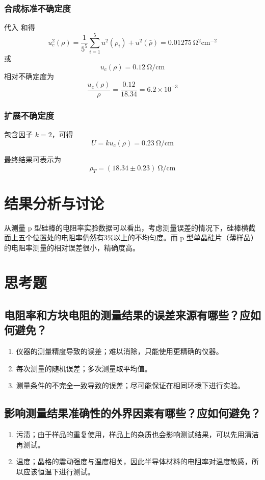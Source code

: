 \documentclass[a4paper,utf8]{article}
\begin{document}
        \subsubsection{合成标准不确定度}
        代入 和得
        \begin{equation}
            u_c^2(\rho)=\frac{1}{5^5} \sum_{i=1}^{5}u^2(\rho_i) + u^2(\bar{\rho})= 0.01275~\unit{\ohm^2\cm^{-2}}
        \end{equation}
        或
        \begin{equation}
            u_c(\rho)=0.12~\unit{\ohm\per\cm}
        \end{equation}
        相对不确定度为
        \begin{equation}
            \frac{u_c(\rho)}{\rho}=\frac{0.12}{18.34} = 6.2 \times 10^{-3}
        \end{equation}
        \subsubsection{扩展不确定度}
        包含因子 $k = 2$，可得
        \begin{equation}
            U=k u_c(\rho)=0.23~\unit{\ohm\per\cm}
        \end{equation}\par
        最终结果可表示为
        \begin{equation}
            \rho_T = (18.34 \pm 0.23)~\unit{\ohm\per\cm}
        \end{equation}
\section{结果分析与讨论}
    从测量 p 型硅棒的电阻率实验数据可以看出，考虑测量误差的情况下，硅棒横截面上五个位置处的电阻率仍然有3\%以上的不均匀度。而 p 型单晶硅片（薄样品）的电阻率测量的相对误差很小，精确度高。
\section{思考题} 
    \subsection{电阻率和方块电阻的测量结果的误差来源有哪些？应如何避免？}
        \begin{enumerate}
            \item 仪器的测量精度导致的误差；难以消除，只能使用更精确的仪器。
            \item 每次测量的随机误差；多次测量取平均值。
            \item 测量条件的不完全一致导致的误差；尽可能保证在相同环境下进行实验。
        \end{enumerate}
    \subsection{影响测量结果准确性的外界因素有哪些？应如何避免？}
        \begin{enumerate}
            \item 污渍；由于样品的重复使用，样品上的杂质也会影响测试结果，可以先用清洁再测试。
            \item 温度；晶格的震动强度与温度相关，因此半导体材料的电阻率对温度敏感，所以应该恒温下进行测试。
        \end{enumerate}
\end{document}
